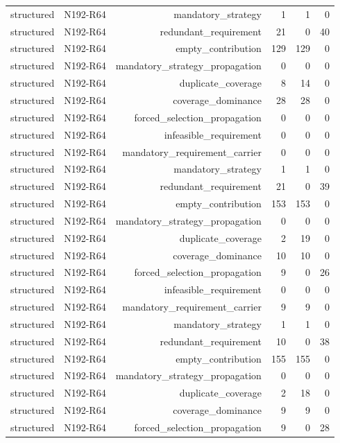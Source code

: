 {\begin{longtable}{lrrrrr}
structured & N192-R64 & mandatory\_strategy & 1 & 1 & 0 \\
structured & N192-R64 & redundant\_requirement & 21 & 0 & 40 \\
structured & N192-R64 & empty\_contribution & 129 & 129 & 0 \\
structured & N192-R64 & mandatory\_strategy\_propagation & 0 & 0 & 0 \\
structured & N192-R64 & duplicate\_coverage & 8 & 14 & 0 \\
structured & N192-R64 & coverage\_dominance & 28 & 28 & 0 \\
structured & N192-R64 & forced\_selection\_propagation & 0 & 0 & 0 \\
structured & N192-R64 & infeasible\_requirement & 0 & 0 & 0 \\
structured & N192-R64 & mandatory\_requirement\_carrier & 0 & 0 & 0 \\
structured & N192-R64 & mandatory\_strategy & 1 & 1 & 0 \\
structured & N192-R64 & redundant\_requirement & 21 & 0 & 39 \\
structured & N192-R64 & empty\_contribution & 153 & 153 & 0 \\
structured & N192-R64 & mandatory\_strategy\_propagation & 0 & 0 & 0 \\
structured & N192-R64 & duplicate\_coverage & 2 & 19 & 0 \\
structured & N192-R64 & coverage\_dominance & 10 & 10 & 0 \\
structured & N192-R64 & forced\_selection\_propagation & 9 & 0 & 26 \\
structured & N192-R64 & infeasible\_requirement & 0 & 0 & 0 \\
structured & N192-R64 & mandatory\_requirement\_carrier & 9 & 9 & 0 \\
structured & N192-R64 & mandatory\_strategy & 1 & 1 & 0 \\
structured & N192-R64 & redundant\_requirement & 10 & 0 & 38 \\
structured & N192-R64 & empty\_contribution & 155 & 155 & 0 \\
structured & N192-R64 & mandatory\_strategy\_propagation & 0 & 0 & 0 \\
structured & N192-R64 & duplicate\_coverage & 2 & 18 & 0 \\
structured & N192-R64 & coverage\_dominance & 9 & 9 & 0 \\
structured & N192-R64 & forced\_selection\_propagation & 9 & 0 & 28 \\

\end{longtable}}
